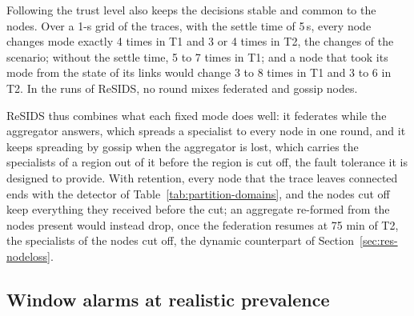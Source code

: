 Following the trust level also keeps the decisions stable and common to the nodes. Over a 1-s grid of the traces, with the settle time of 5\,s, every node changes mode exactly 4 times in T1 and 3 or 4 times in T2, the changes of the scenario; without the settle time, 5 to 7 times in T1; and a node that took its mode from the state of its links would change 3 to 8 times in T1 and 3 to 6 in T2. In the runs of ReSIDS, no round mixes federated and gossip nodes.

ReSIDS thus combines what each fixed mode does well: it federates while the aggregator answers, which spreads a specialist to every node in one round, and it keeps spreading by gossip when the aggregator is lost, which carries the specialists of a region out of it before the region is cut off, the fault tolerance it is designed to provide. With retention, every node that the trace leaves connected ends with the detector of Table~\ref{tab:partition-domains}, and the nodes cut off keep everything they received before the cut; an aggregate re-formed from the nodes present would instead drop, once the federation resumes at 75 min of T2, the specialists of the nodes cut off, the dynamic counterpart of Section~\ref{sec:res-nodeloss}.

\subsection{Window alarms at realistic prevalence}
\label{sec:res-windows}


